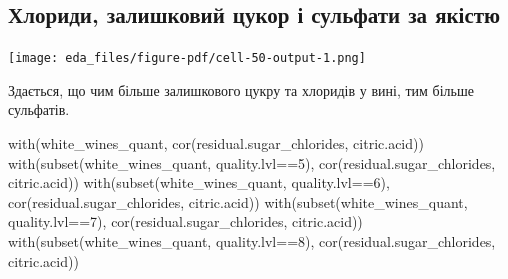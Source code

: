\documentclass[
  letterpaper,
  DIV=11,
  numbers=noendperiod]{scrreprt}
\newenvironment{Shaded}{\begin{snugshade}}{\end{snugshade}}
\newcommand{\AttributeTok}[1]{\textcolor[rgb]{0.40,0.45,0.13}{#1}}
\newcommand{\CommentTok}[1]{\textcolor[rgb]{0.37,0.37,0.37}{#1}}
\newcommand{\DecValTok}[1]{\textcolor[rgb]{0.68,0.00,0.00}{#1}}
\newcommand{\FloatTok}[1]{\textcolor[rgb]{0.68,0.00,0.00}{#1}}
\newcommand{\FunctionTok}[1]{\textcolor[rgb]{0.28,0.35,0.67}{#1}}
\newcommand{\NormalTok}[1]{\textcolor[rgb]{0.00,0.23,0.31}{#1}}
\newcommand{\SpecialCharTok}[1]{\textcolor[rgb]{0.37,0.37,0.37}{#1}}
\newcommand{\StringTok}[1]{\textcolor[rgb]{0.13,0.47,0.30}{#1}}
\begin{document}
\subsection{Хлориди, залишковий цукор і сульфати за
якістю}\label{ux445ux43bux43eux440ux438ux434ux438-ux437ux430ux43bux438ux448ux43aux43eux432ux438ux439-ux446ux443ux43aux43eux440-ux456-ux441ux443ux43bux44cux444ux430ux442ux438-ux437ux430-ux44fux43aux456ux441ux442ux44e}

\begin{Shaded}
\end{Shaded}

\texttt{[image: eda\_files/figure-pdf/cell-50-output-1.png]}

Здається, що чим більше залишкового цукру та хлоридів у вині, тим більше
сульфатів.

\begin{Shaded}
\begin{Highlighting}[]
\FunctionTok{with}\NormalTok{(white\_wines\_quant, }\FunctionTok{cor}\NormalTok{(residual.sugar\_chlorides, citric.acid))}
\FunctionTok{with}\NormalTok{(}\FunctionTok{subset}\NormalTok{(white\_wines\_quant, quality.lvl}\SpecialCharTok{==}\DecValTok{5}\NormalTok{),}
     \FunctionTok{cor}\NormalTok{(residual.sugar\_chlorides, citric.acid))}
\FunctionTok{with}\NormalTok{(}\FunctionTok{subset}\NormalTok{(white\_wines\_quant, quality.lvl}\SpecialCharTok{==}\DecValTok{6}\NormalTok{),}
     \FunctionTok{cor}\NormalTok{(residual.sugar\_chlorides, citric.acid))}
\FunctionTok{with}\NormalTok{(}\FunctionTok{subset}\NormalTok{(white\_wines\_quant, quality.lvl}\SpecialCharTok{==}\DecValTok{7}\NormalTok{),}
     \FunctionTok{cor}\NormalTok{(residual.sugar\_chlorides, citric.acid))}
\FunctionTok{with}\NormalTok{(}\FunctionTok{subset}\NormalTok{(white\_wines\_quant, quality.lvl}\SpecialCharTok{==}\DecValTok{8}\NormalTok{),}
     \FunctionTok{cor}\NormalTok{(residual.sugar\_chlorides, citric.acid))}
\end{Highlighting}
\end{Shaded}
\end{document}
